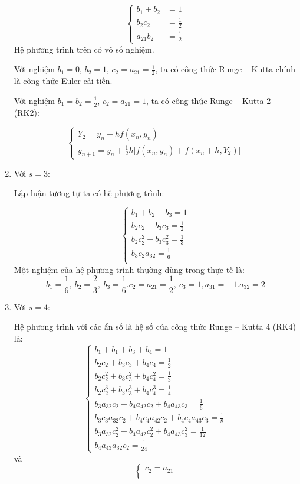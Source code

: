 \begin{enumerate}[label=\alph*)]
$$\begin{cases}
			b_1+b_2&=1\\
			b_2 c_2&=\frac12\\
			a_{21}b_2&=\frac12
		\end{cases}$$
		Hệ phương trình trên có vô số nghiệm.\par
		Với nghiệm $b_1=0$, $b_2=1$, $c_2=a_{21}=\frac12$, ta có công thức Runge – Kutta chính là công thức Euler cải tiến.\par
		Với nghiệm $b_1=b_2=\frac12$, $c_2=a_{21}=1$, ta có công thức Runge – Kutta 2 (RK2):\par
		$$\begin{cases}
			Y_2=y_n+hf(x_n,y_n)\\
			y_{n+1}=y_n+\frac12h\big[f(x_n,y_n)+f(x_n+h,Y_2)\big]
		\end{cases}$$
	\item Với $s=3$:\par
		Lập luận tương tự ta có hệ phương trình:\par
		$$\begin{cases}
			b_1+b_2+b_3=1\\
			b_2 c_2 + b_3 c_3 =\frac12\\
			b_2 c_2^2 + b_3 c_3^2=\frac13\\
			b_3 c_2 a_{32}=\frac16\\
		\end{cases}$$
		Một nghiệm của hệ phương trình thường dùng trong thực tế là:
		$$b_1=\frac16,~b_2=\frac23,~b_3=\frac16. c_2=a_{21}=\frac12,~c_3=1,a_{31}=-1.a_{32}=2$$
	\item Với $s=4$:\par
		Hệ phương trình với các ẩn số là hệ số của công thức Runge – Kutta 4 (RK4) là:\\
		$$\begin{cases}
			b_1+b_1+b_3+b_4=1\\
			b_2c_2+b_3c_3+b_4c_4=\frac12\\
			b_2c_2^2+b_3c_3^2+b_4c_4^2=\frac13\\
			b_2c_2^3+b_3c_3^3+b_4c_4^3=\frac14\\
			b_3a_{32}c_2+b_4a_{42}c_2+b_4a_{43}c_3=\frac16\\
			b_3c_3a_{32}c_2+b_4c_4a_{42}c_2+b_4c_4a_{43}c_3=\frac18\\
			b_3a_{32}c_2^2+b_4a_{42}c_2^2+b_4a_{43}c_3^2=\frac{1}{12}\\
			b_4a_{43}a_{32}c_2=\frac{1}{24}
		\end{cases}$$
		và
		$$\begin{cases}
			c_2=a_{21}\\

\end{cases}$$
\end{enumerate}

